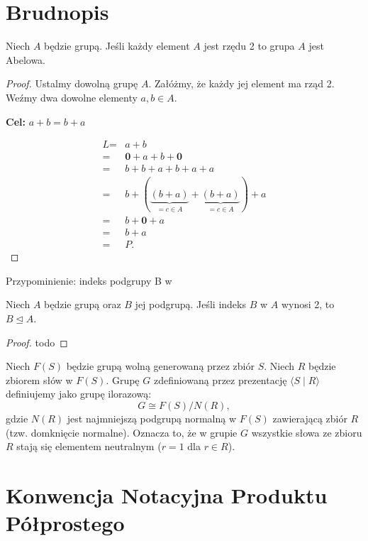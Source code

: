 \section{Brudnopis}
\begin{theorem}
      Niech $A$ będzie grupą. Jeśli każdy element $A$ jest rzędu 2 to grupa $A$ jest Abelowa.
\end{theorem} 
\begin{proof}
	Ustalmy dowolną grupę $A$. Załóżmy, że każdy jej element ma rząd 2. Weźmy dwa dowolne elementy $a,b\in A$.
	
	\textbf{Cel:} $a+b = b+a$

	\begin{align*}	
		\textit{L} =& a+b \\
		=& \mathbf{0} + a + b + \mathbf{0} \\
		=& b + b + a + b + a + a \\
		=& b + (\underbrace{(b+a)}_{=c \in A} + \underbrace{(b+a)}_{=c \in A} )+ a  \\
		=& b + \mathbf{0} + a \\
		=& b+ a \\
		=& \textit{P}  
	.\end{align*} 

\end{proof} 

Przypominienie: indeks podgrupy B w  
\begin{theorem}
	Niech $A$ będzie grupą oraz $B$ jej podgrupą. Jeśli indeks $B$ w $A$ wynosi 2, to $B \unlhd A$.
\end{theorem} 
\begin{proof}
	todo
\end{proof} 

\begin{definition}
Niech $F(S)$ będzie grupą wolną generowaną przez zbiór $S$. Niech $R$ będzie zbiorem słów w $F(S)$.
Grupę $G$ zdefiniowaną przez prezentację $\langle S \mid R \rangle$ definiujemy jako grupę ilorazową:
\[ G \cong F(S) / N(R), \]
gdzie $N(R)$ jest najmniejszą podgrupą normalną w $F(S)$ zawierającą zbiór $R$ (tzw. domknięcie normalne).
Oznacza to, że w grupie $G$ wszystkie słowa ze zbioru $R$ stają się elementem neutralnym ($r=1$ dla $r \in R$).
\end{definition}

\section{Konwencja Notacyjna Produktu Półprostego}

